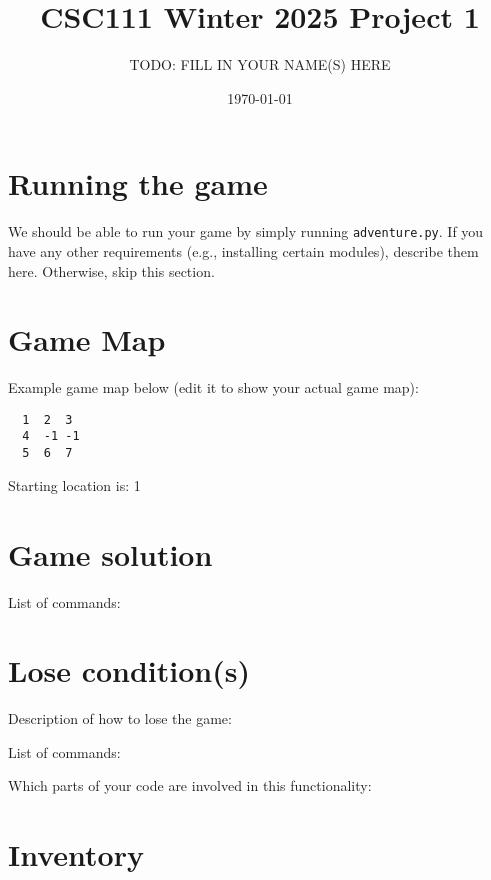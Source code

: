 \documentclass[11pt]{article}
\title{CSC111 Winter 2025 Project 1}
\author{TODO: FILL IN YOUR NAME(S) HERE}
\date{\today}
\begin{document}
\maketitle

\section*{Running the game}
We should be able to run your game by simply running \texttt{adventure.py}. If you have any other requirements (e.g., installing certain modules), describe them here. Otherwise, skip this section.

\section*{Game Map}
Example game map below (edit it to show your actual game map):

\begin{verbatim}
  1  2  3
  4  -1 -1
  5  6  7
\end{verbatim}

Starting location is: 1

\section*{Game solution}
List of commands:

\section*{Lose condition(s)}
Description of how to lose the game:

List of commands:

Which parts of your code are involved in this functionality:


\section*{Inventory}
\end{document}
